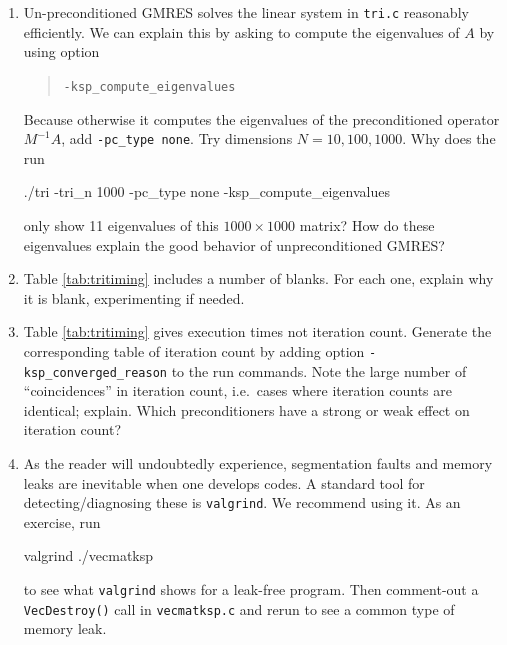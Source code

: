 \begin{enumerate}
\item \label{exer:computeeigs} Un-preconditioned GMRES solves the linear system in \texttt{tri.c} reasonably efficiently.  We can explain this by asking \PETSc to compute the eigenvalues of $A$ by using option
\begin{quote}
\texttt{-ksp\_compute\_eigenvalues}
\end{quote}
Because otherwise it computes the eigenvalues of the preconditioned operator $M^{-1}A$, add \texttt{-pc\_type none}.  Try dimensions $N=10,100,1000$.  Why does the  run
\begin{cline}
./tri -tri_n 1000 -pc_type none -ksp_compute_eigenvalues
\end{cline}
only show 11 eigenvalues of this $1000\times 1000$ matrix?  How do these eigenvalues explain the good behavior of unpreconditioned GMRES?

\item Table \ref{tab:tritiming} includes a number of blanks.  For each one, explain why it is blank, experimenting if needed.

\item Table \ref{tab:tritiming} gives execution times not iteration count.  Generate the corresponding table of \pKSP iteration count by adding option \verb|-ksp_converged_reason| to the run commands.  Note the large number of ``coincidences'' in iteration count, i.e.~cases where iteration counts are identical; explain.  Which preconditioners have a strong or weak effect on iteration count?

\item As the reader will undoubtedly experience, segmentation faults and memory leaks are inevitable when one develops \PETSc codes.  A standard tool for detecting/diagnosing these is \texttt{valgrind}.  We recommend using it.  As an exercise, run
\begin{cline}
valgrind ./vecmatksp
\end{cline}
to see what \texttt{valgrind} shows for a leak-free program.  Then comment-out a \texttt{VecDestroy()} call in \texttt{vecmatksp.c} and rerun to see a common type of memory leak.


\end{enumerate}
